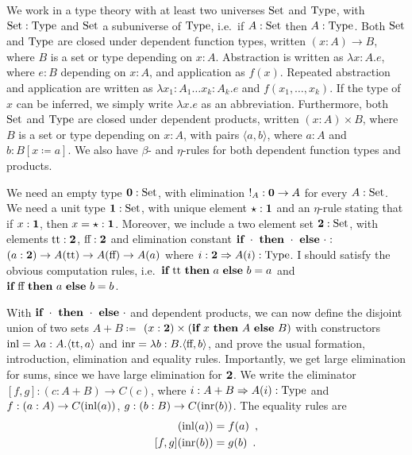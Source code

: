 \documentclass{article}
\begin{document}
We work in a type theory with at least two universes $\text{Set}$ and
$\text{Type}$, with $\text{Set} : \text{Type}$ and $\text{Set}$ a subuniverse of $\text{Type}$,
i.e.\ if $A : \text{Set}$ then $A : \text{Type}$. Both $\text{Set}$ and $\text{Type}$ are
closed under dependent function types, written $(x : A) \to B$, where
$B$ is a set or type depending on $x: A$. Abstraction is written as
$\lambda x : A . e$, where $e : B$ depending on $x : A$, and
application as $f(x)$. Repeated abstraction and application are
written as $\lambda x_1 : A_1 \ldots x_k : A_k . e$ and $f(x_1,
\ldots, x_k)$. If the type of $x$ can be inferred, we simply write
$\lambda x.e$ as an abbreviation.  Furthermore, both $\text{Set}$ and
$\text{Type}$ are closed under dependent products, written $(x : A) \times
B$, where $B$ is a set or type depending on $x: A$, with pairs
$\langle a , b \rangle$, where $a : A$ and $b : B[x \coloneqq a]$.
We also have $\beta$- and $\eta$-rules for both dependent function types
and products.

We need an empty type $\mathbf{0} : \text{Set}$, with elimination ${!_A : \mathbf{0}
  \to A}$ for every $A : \text{Set}$. We need a unit type $\mathbf{1} : \text{Set}$,
with unique element $\star : \mathbf{1}$ and an $\eta$-rule stating that
if $x : \mathbf{1}$, then $x = \star : \mathbf{1}$. Moreover, we include a two
element set $\mathbf{2} : \text{Set}$, with elements $\text{tt} : \mathbf{2}$, $\text{ff} :
\mathbf{2}$ and elimination constant $\textbf{if}~\cdot~\textbf{then}~\cdot~\textbf{else}~\cdot :$
$(a : \mathbf{2}) \to A(\text{tt}) \to A(\text{ff}) \to A(a)$ where $i : \mathbf{2}
\Rightarrow A(i) : \text{Type}$. I should satisfy the obvious computation
rules, i.e.\ $\textbf{if}~\text{tt}~\textbf{then}~a~\textbf{else}~b = a$ and
$\textbf{if}~\text{ff}~\textbf{then}~a~\textbf{else}~b = b$.

With $\textbf{if}~\cdot~\textbf{then}~\cdot~\textbf{else}~\cdot$ and dependent products, we can now
define the disjoint union of two sets $A + B \coloneqq$ ${(x : \mathbf{2})}
\times (\textbf{if}~x~\textbf{then}~A~\textbf{else}~B)$ with constructors $\text{inl} = \lambda {a :
  A} . \langle \text{tt} , a \rangle$ and $\text{inr} = \lambda {b : B}
. \langle \text{ff} , b \rangle$, and prove the usual formation,
introduction, elimination and equality rules. Importantly, we get
large elimination for sums, since we have large elimination for
$\mathbf{2}$. We write the eliminator $[f, g] : {(c : A + B)} \to C(c)$, where
$i : A + B \Rightarrow A(i) : \text{Type}$ and $f : (a : A) \to C(\text{inl}(a))$,
$g : (b : B) \to C(\text{inr}(b))$. The equality rules are
\begin{align*}
[f, g](\inl(a)) &= f(a) \enspace , \\
[f, g](\inr(b)) &= g(b) \enspace .
\end{align*}
\end{document}
